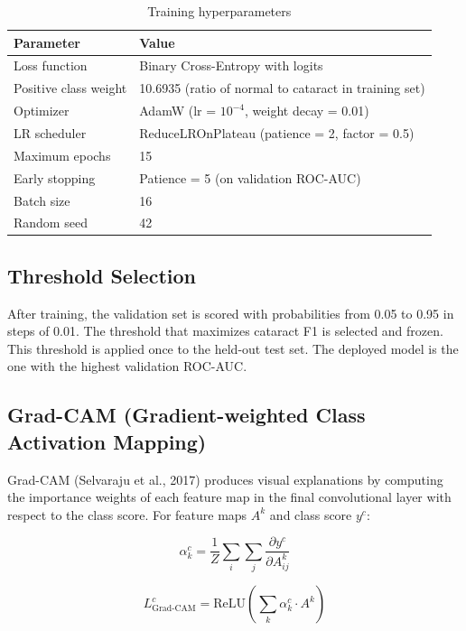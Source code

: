\documentclass[12pt, a4paper]{article}
\begin{document}
\begin{table}[H]
\centering
\begin{tabular}{@{}ll@{}}
\toprule
\textbf{Parameter} & \textbf{Value} \\
\midrule
Loss function & Binary Cross-Entropy with logits \\
Positive class weight & 10.6935 (ratio of normal to cataract in training set) \\
Optimizer & AdamW (lr = $10^{-4}$, weight decay = 0.01) \\
LR scheduler & ReduceLROnPlateau (patience = 2, factor = 0.5) \\
Maximum epochs & 15 \\
Early stopping & Patience = 5 (on validation ROC-AUC) \\
Batch size & 16 \\
Random seed & 42 \\
\bottomrule
\end{tabular}
\caption{Training hyperparameters}
\end{table}

\subsection{Threshold Selection}
After training, the validation set is scored with probabilities from 0.05 to 0.95 in steps of 0.01. The threshold that maximizes cataract F1 is selected and frozen. This threshold is applied once to the held-out test set. The deployed model is the one with the highest validation ROC-AUC.

\subsection{Grad-CAM (Gradient-weighted Class Activation Mapping)}
Grad-CAM (Selvaraju et al., 2017) produces visual explanations by computing the importance weights of each feature map in the final convolutional layer with respect to the class score. For feature maps $A^k$ and class score $y^c$:

\begin{equation}
\alpha_k^c = \frac{1}{Z} \sum_i \sum_j \frac{\partial y^c}{\partial A_{ij}^k}
\end{equation}

\begin{equation}
L^c_{\text{Grad-CAM}} = \text{ReLU}\left(\sum_k \alpha_k^c \cdot A^k\right)
\end{equation}
\end{document}
